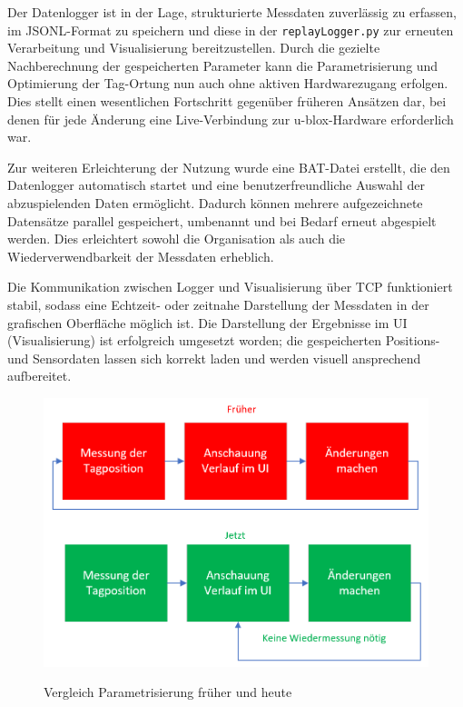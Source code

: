 \documentclass[a4paper, 12pt]{article} %
\begin{document}
Der Datenlogger ist in der Lage, strukturierte Messdaten zuverlässig zu erfassen, im \ac{JSONL}-Format zu speichern und diese in der 
\texttt{replayLogger.py} zur erneuten Verarbeitung und Visualisierung bereitzustellen. Durch die gezielte Nachberechnung der gespeicherten 
Parameter kann die Parametrisierung und Optimierung der Tag-Ortung nun auch ohne aktiven Hardwarezugang erfolgen. Dies stellt einen wesentlichen
 Fortschritt gegenüber früheren Ansätzen dar, bei denen für jede Änderung eine Live-Verbindung zur u-blox-Hardware erforderlich war.

Zur weiteren Erleichterung der Nutzung wurde eine \acf{BAT}-Datei erstellt, die den Datenlogger automatisch 
startet und eine benutzerfreundliche Auswahl der abzuspielenden Daten ermöglicht. Dadurch können mehrere aufgezeichnete Datensätze
 parallel gespeichert, umbenannt und bei Bedarf erneut abgespielt werden. Dies erleichtert sowohl die Organisation als auch die Wiederverwendbarkeit
  der Messdaten erheblich.

Die Kommunikation zwischen Logger und Visualisierung über \ac{TCP} funktioniert stabil, sodass eine Echtzeit- oder zeitnahe Darstellung 
der Messdaten in der grafischen Oberfläche möglich ist. Die Darstellung der Ergebnisse im \acf{UI} (Visualisierung) ist erfolgreich umgesetzt worden; die gespeicherten
 Positions- und Sensordaten lassen sich korrekt laden und werden visuell ansprechend aufbereitet.

\begin{figure}[H]
    \includegraphics[width=1\linewidth]{images/Vergleich Parametrisierung.png}\\[1ex]
    \centering
    \caption{Vergleich Parametrisierung früher und heute}
    \label{ABBILDUNG}
\end{figure}
\end{document}
